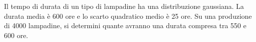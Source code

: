 Il tempo di durata di un tipo di lampadine ha una distribuzione 
gaussiana. 
La durata media è 600 ore e lo scarto quadratico medio è 25 ore. 
Su una produzione di 4000 lampadine, si determini quante avranno 
una durata compresa tra 550 e 600 ore.